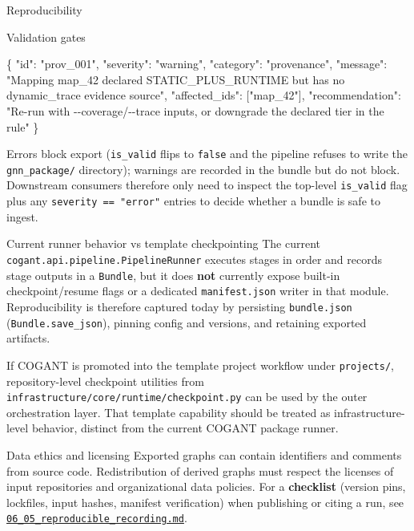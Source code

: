 \documentclass[
  ignorenonframetext,
]{beamer}
\newenvironment{Shaded}{}{}
\newcommand{\DataTypeTok}[1]{\textcolor[rgb]{0.56,0.13,0.00}{#1}}
\newcommand{\FunctionTok}[1]{\textcolor[rgb]{0.02,0.16,0.49}{#1}}
\newcommand{\OtherTok}[1]{\textcolor[rgb]{0.00,0.44,0.13}{#1}}
\newcommand{\StringTok}[1]{\textcolor[rgb]{0.25,0.44,0.63}{#1}}
\begin{document}
\begin{frame}[fragile]{Reproducibility}
\begin{block}{Validation gates}
\begin{Shaded}
\begin{Highlighting}[]
\FunctionTok{\{}
  \DataTypeTok{"id"}\FunctionTok{:} \StringTok{"prov\_001"}\FunctionTok{,}
  \DataTypeTok{"severity"}\FunctionTok{:} \StringTok{"warning"}\FunctionTok{,}
  \DataTypeTok{"category"}\FunctionTok{:} \StringTok{"provenance"}\FunctionTok{,}
  \DataTypeTok{"message"}\FunctionTok{:} \StringTok{"Mapping \textquotesingle{}map\_42\textquotesingle{} declared STATIC\_PLUS\_RUNTIME but has no dynamic\_trace evidence source"}\FunctionTok{,}
  \DataTypeTok{"affected\_ids"}\FunctionTok{:} \OtherTok{[}\StringTok{"map\_42"}\OtherTok{]}\FunctionTok{,}
  \DataTypeTok{"recommendation"}\FunctionTok{:} \StringTok{"Re{-}run with {-}{-}coverage/{-}{-}trace inputs, or downgrade the declared tier in the rule"}
\FunctionTok{\}}
\end{Highlighting}
\end{Shaded}

Errors block export (\texttt{is\_valid} flips to \texttt{false} and the
pipeline refuses to write the \texttt{gnn\_package/} directory);
warnings are recorded in the bundle but do not block. Downstream
consumers therefore only need to inspect the top-level
\texttt{is\_valid} flag plus any \texttt{severity\ ==\ "error"} entries
to decide whether a bundle is safe to ingest.
\end{block}

\begin{block}{Current runner behavior vs template checkpointing}
\protect{}\label{current-runner-behavior-vs-template-checkpointing}
The current \texttt{cogant.api.pipeline.PipelineRunner} executes stages
in order and records stage outputs in a \texttt{Bundle}, but it does
\textbf{not} currently expose built-in checkpoint/resume flags or a
dedicated \texttt{manifest.json} writer in that module. Reproducibility
is therefore captured today by persisting \texttt{bundle.json}
(\texttt{Bundle.save\_json}), pinning config and versions, and retaining
exported artifacts.

If COGANT is promoted into the template project workflow under
\texttt{projects/}, repository-level checkpoint utilities from
\texttt{infrastructure/core/runtime/checkpoint.py} can be used by the
outer orchestration layer. That template capability should be treated as
infrastructure-level behavior, distinct from the current COGANT package
runner.
\end{block}

\begin{block}{Data ethics and licensing}
\protect{}\label{data-ethics-and-licensing}
Exported graphs can contain identifiers and comments from source code.
Redistribution of derived graphs must respect the licenses of input
repositories and organizational data policies. For a \textbf{checklist}
(version pins, lockfiles, input hashes, manifest verification) when
publishing or citing a run, see
\href{06_05_reproducible_recording.md}{\texttt{06\_05\_reproducible\_recording.md}}.
\end{block}
\end{frame}
\end{document}
